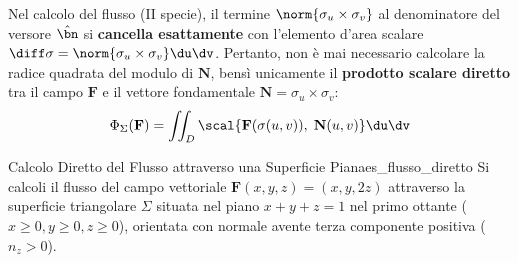 \begin{osservazione}
Nel calcolo del flusso (II specie), il termine $\norm{\sigma_u \times \sigma_v}$ al denominatore del versore $\hat{\bn}$ si \textbf{cancella esattamente} con l'elemento d'area scalare $\diff\sigma = \norm{\sigma_u \times \sigma_v} \du\dv$. Pertanto, non è mai necessario calcolare la radice quadrata del modulo di $\mathbf{N}$, bensì unicamente il \textbf{prodotto scalare diretto} tra il campo $\mathbf{F}$ e il vettore fondamentale $\mathbf{N} = \sigma_u \times \sigma_v$:
\[
\Phi_\Sigma(\mathbf{F}) = \iint_D \scal{\mathbf{F}(\sigma(u,v)), \; \mathbf{N}(u,v)} \du\dv
\]
\end{osservazione}

\begin{esempio}{Calcolo Diretto del Flusso attraverso una Superficie Piana}{es_flusso_diretto}
Si calcoli il flusso del campo vettoriale $\mathbf{F}(x,y,z) = (x, y, 2z)$ attraverso la superficie triangolare $\Sigma$ situata nel piano $x + y + z = 1$ nel primo ottante ($x \ge 0, y \ge 0, z \ge 0$), orientata con normale avente terza componente positiva ($n_z > 0$).


\end{esempio}
